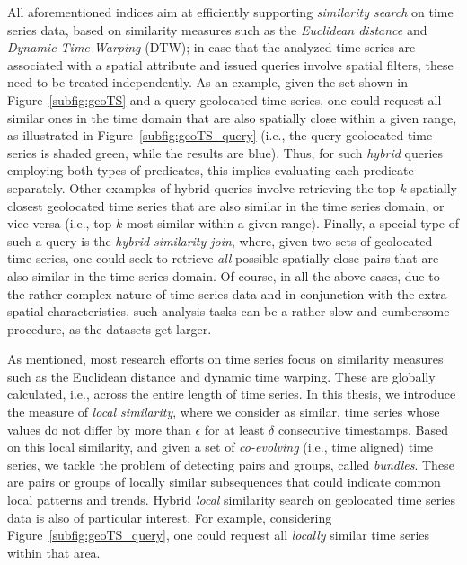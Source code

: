 All aforementioned indices aim at efficiently supporting \textit{similarity search} on time series data, based on similarity measures such as the \textit{Euclidean distance} and \textit{Dynamic Time Warping} (DTW); in case that the analyzed time series are associated with a spatial attribute and issued queries involve spatial filters, these need to be treated independently. As an example, given the set shown in Figure~\ref{subfig:geoTS} and a query geolocated time series, one could request all similar ones in the time domain that are also spatially close within a given range, as illustrated in Figure~\ref{subfig:geoTS_query} (i.e., the query geolocated time series is shaded green, while the results are blue). Thus, for such \textit{hybrid} queries employing both types of predicates, this implies evaluating each predicate separately. Other examples of hybrid queries involve retrieving the top-$k$ spatially closest geolocated time series that are also similar in the time series domain, or vice versa (i.e., top-$k$ most similar within a given range). Finally, a special type of such a query is the \textit{hybrid similarity join}, where, given two sets of geolocated time series, one could seek to retrieve \textit{all} possible spatially close pairs that are also similar in the time series domain. Of course, in all the above cases, due to the rather complex nature of time series data and in conjunction with the extra spatial characteristics, such analysis tasks can be a rather slow and cumbersome procedure, as the datasets get larger.

As mentioned, most research efforts on time series focus on similarity measures such as the Euclidean distance and dynamic time warping. These are globally calculated, i.e., across the entire length of time series. In this thesis, we introduce the measure of \textit{local similarity}, where we consider as similar, time series whose values do not differ by more than $\epsilon$ for at least $\delta$ consecutive timestamps. Based on this local similarity, and given a set of \textit{co-evolving} (i.e., time aligned) time series, we tackle the problem of detecting pairs and groups, called \textit{bundles}. These are pairs or groups of locally similar subsequences that could indicate common local patterns and trends. Hybrid \textit{local} similarity search on geolocated time series data is also of particular interest. For example, considering Figure~\ref{subfig:geoTS_query}, one could request all \textit{locally} similar time series within that area.

